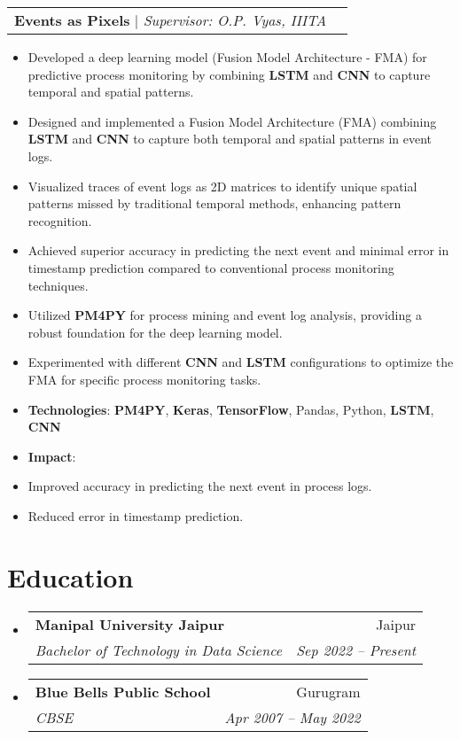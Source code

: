 \documentclass[letterpaper,11pt]{article}
\makeatletter
\newcommand{\resumeItem}[1]{
  \item\small{
    {#1 \vspace{-2pt}}
  }
}
\newcommand{\resumeSubheading}[4]{
  \vspace{-2pt}\item
    \begin{tabular*}{0.97\textwidth}[t]{l@{\extracolsep{\fill}}r}
      \textbf{#1} & #2 \\
      \textit{\small#3} & \textit{\small #4} \\
    \end{tabular*}\vspace{-7pt}
}
\newcommand{\resumeProjectHeading}[2]{
    \item
    \begin{tabular*}{0.97\textwidth}{l@{\extracolsep{\fill}}r}
      \small#1 & #2 \\
    \end{tabular*}\vspace{-7pt}
}
\newcommand{\resumeSubHeadingListStart}{\begin{itemize}[leftmargin=0.15in, label={}]}
\newcommand{\resumeSubHeadingListEnd}{\end{itemize}}
\newcommand{\resumeItemListStart}{\begin{itemize}}
\newcommand{\resumeItemListEnd}{\end{itemize}\vspace{-5pt}}
\makeatother
\begin{document}
    \resumeProjectHeading
        {\textbf{Events as Pixels} $|$ \emph{Supervisor: O.P. Vyas, IIITA}}{}
        \resumeItemListStart
            \resumeItem{Developed a deep learning model (Fusion Model Architecture - FMA) for predictive process monitoring by combining \textbf{LSTM} and \textbf{CNN} to capture temporal and spatial patterns.}
            \resumeItem{Designed and implemented a Fusion Model Architecture (FMA) combining \textbf{LSTM} and \textbf{CNN} to capture both temporal and spatial patterns in event logs.}
            \resumeItem{Visualized traces of event logs as 2D matrices to identify unique spatial patterns missed by traditional temporal methods, enhancing pattern recognition.}
            \resumeItem{Achieved superior accuracy in predicting the next event and minimal error in timestamp prediction compared to conventional process monitoring techniques.}
            \resumeItem{Utilized \textbf{PM4PY} for process mining and event log analysis, providing a robust foundation for the deep learning model.}
            \resumeItem{Experimented with different \textbf{CNN} and \textbf{LSTM} configurations to optimize the FMA for specific process monitoring tasks.}
            \resumeItem{\textbf{Technologies}: \textbf{PM4PY}, \textbf{Keras}, \textbf{TensorFlow}, Pandas, Python, \textbf{LSTM}, \textbf{CNN}}
            \resumeItem{\textbf{Impact}:}
            \resumeItem{Improved accuracy in predicting the next event in process logs.}
            \resumeItem{Reduced error in timestamp prediction.}
        \resumeItemListEnd

\section{Education}
  \resumeSubHeadingListStart
    \resumeSubheading
      {Manipal University Jaipur}{Jaipur}
      {Bachelor of Technology in Data Science}{Sep 2022 -- Present}
    \resumeSubheading
      {Blue Bells Public School}{Gurugram}
      {CBSE}{Apr 2007 -- May 2022}
  \resumeSubHeadingListEnd
%
\end{document}
